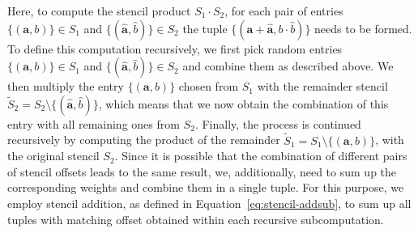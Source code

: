 Here, to compute the stencil product $S_1 \cdot S_2$, for each pair of entries $\{(\bm{a}, b ) \} \in S_1$ and $\{(\bm{\hat{a}}, \hat{b} ) \} \in S_2$ the tuple $\{(\bm{a} + \bm{\hat{a}}, b \cdot \hat{b} ) \}$ needs to be formed.
To define this computation recursively, we first pick random entries $\{(\bm{a}, b ) \} \in S_1$ and $\{(\bm{\hat{a}}, \hat{b} ) \} \in S_2$ and combine them as described above.
We then multiply the entry $\{(\bm{a}, b ) \}$ chosen from $S_1$ with the remainder stencil $\tilde{S}_2 = S_2 \setminus \{(\bm{\hat{a}}, \hat{b} ) \}$, which means that we now obtain the combination of this entry with all remaining ones from $S_2$.
Finally, the process is continued recursively by computing the product of the remainder $\tilde{S}_1 = S_1 \setminus \{(\bm{a}, b ) \}$, with the original stencil $S_2$.
Since it is possible that the combination of different pairs of stencil offsets leads to the same result, we, additionally, need to sum up the corresponding weights and combine them in a single tuple.
For this purpose, we employ stencil addition, as defined in Equation~\eqref{eq:stencil-addsub}, to sum up all tuples with matching offset obtained within each recursive subcomputation.
